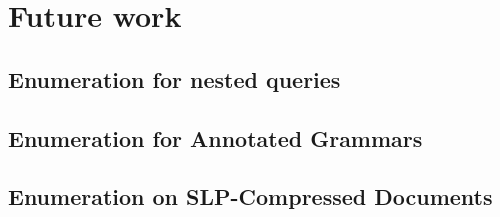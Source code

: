 \documentclass[pdftex]{pucthesis}	%
\begin{document}


\section{Future work}



\subsection{Enumeration for nested queries}



\subsection{Enumeration for Annotated Grammars}



\subsection{Enumeration on SLP-Compressed Documents}



%


\cleardoublepage
{} \label{references}

\renewcommand{\bibname}{REFERENCES}





%


%
%
%
%
%
%
\end{document}
